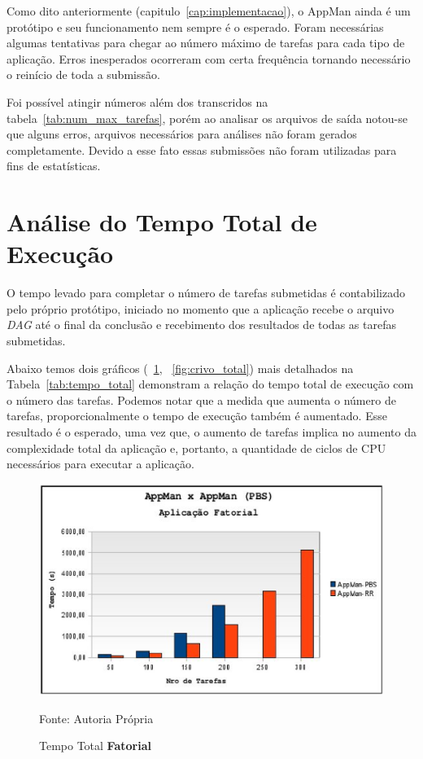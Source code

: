 Como dito anteriormente (capitulo~\ref{cap:implementacao}), o AppMan ainda é um protótipo e seu funcionamento nem sempre é o esperado. Foram necessárias algumas tentativas para chegar ao número máximo de tarefas para cada tipo de aplicação. Erros inesperados ocorreram com certa frequência tornando necessário o reinício de toda a submissão. 

Foi possível atingir números além dos transcridos na tabela~\ref{tab:num_max_tarefas}, porém ao analisar os arquivos de saída notou-se que alguns erros, arquivos necessários para análises não foram gerados completamente. Devido a esse fato essas submissões não foram utilizadas para fins de estatísticas.

\section{Análise do Tempo Total de Execução}

O tempo levado para completar o número de tarefas submetidas é contabilizado pelo próprio protótipo, iniciado no momento que a aplicação recebe o arquivo \emph{DAG} até o final da conclusão e recebimento dos resultados de todas as tarefas submetidas. 

Abaixo temos dois gráficos (~\ref{fig:fatorial_total}, ~\ref{fig:crivo_total}) mais detalhados na Tabela~\ref{tab:tempo_total} demonstram a relação do tempo total de execução com o número das tarefas. Podemos notar que a medida que aumenta o número de tarefas, proporcionalmente o tempo de execução também é aumentado. Esse resultado é o esperado, uma vez que, o aumento de tarefas implica no aumento da complexidade total da aplicação e, portanto, a quantidade de ciclos de CPU necessários para executar a aplicação.

\begin{figure}[htb]
\begin{center}
\includegraphics[scale=0.77]{./img/MapaFatorialTempoTotal.ps}
\caption{Tempo Total \textbf{Fatorial}}
\label{fig:fatorial_total}
Fonte: Autoria Própria
\end{center}
\end{figure}

